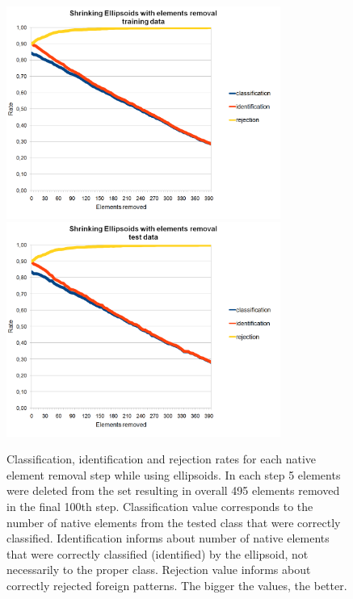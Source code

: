 \begin{figure}[htp]
	\centering
	\includegraphics[width=0.80\textwidth]{Figures/charts/DIGITS/DIGITS_ShrinkingEllipsoidsElementsRemovalTraining.png}
	\hspace{12pt}
	\includegraphics[width=0.80\textwidth]{Figures/charts/DIGITS/DIGITS_ShrinkingEllipsoidsElementsRemovalTest.png}
	\caption{ Classification, identification and rejection rates for each native element removal step while using ellipsoids. In each step 5 elements were deleted from the set resulting in overall 495 elements removed in the final 100th step. Classification value corresponds to the number of native elements from the tested class that were correctly classified. Identification informs about number of native elements that were correctly classified (identified) by the ellipsoid, not necessarily to the proper class. Rejection value informs about correctly rejected foreign patterns. The bigger the values, the better. }
	\label{fig:shrinking_ellipsoids_elements_rejection}\vspace{-3pt}
\end{figure}


